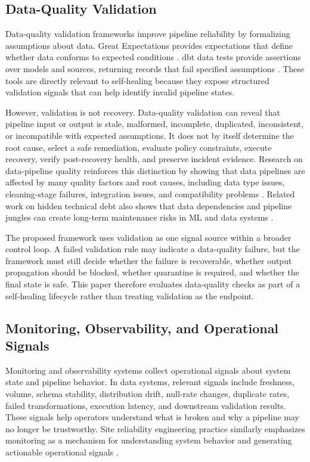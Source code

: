 \subsection{Data-Quality Validation}

Data-quality validation frameworks improve pipeline reliability by formalizing assumptions about data. Great Expectations provides expectations that define whether data conforms to expected conditions \cite{greatexpectations2026}. dbt data tests provide assertions over models and sources, returning records that fail specified assumptions \cite{dbt2026datatests}. These tools are directly relevant to self-healing because they expose structured validation signals that can help identify invalid pipeline states.

However, validation is not recovery. Data-quality validation can reveal that pipeline input or output is stale, malformed, incomplete, duplicated, inconsistent, or incompatible with expected assumptions. It does not by itself determine the root cause, select a safe remediation, evaluate policy constraints, execute recovery, verify post-recovery health, and preserve incident evidence. Research on data-pipeline quality reinforces this distinction by showing that data pipelines are affected by many quality factors and root causes, including data type issues, cleaning-stage failures, integration issues, and compatibility problems \cite{foidl2023pipelinequality}. Related work on hidden technical debt also shows that data dependencies and pipeline jungles can create long-term maintenance risks in ML and data systems \cite{sculley2015hidden}.

The proposed framework uses validation as one signal source within a broader control loop. A failed validation rule may indicate a data-quality failure, but the framework must still decide whether the failure is recoverable, whether output propagation should be blocked, whether quarantine is required, and whether the final state is safe. This paper therefore evaluates data-quality checks as part of a self-healing lifecycle rather than treating validation as the endpoint.

\subsection{Monitoring, Observability, and Operational Signals}

Monitoring and observability systems collect operational signals about system state and pipeline behavior. In data systems, relevant signals include freshness, volume, schema stability, distribution drift, null-rate changes, duplicate rates, failed transformations, execution latency, and downstream validation results. These signals help operators understand what is broken and why a pipeline may no longer be trustworthy. Site reliability engineering practice similarly emphasizes monitoring as a mechanism for understanding system behavior and generating actionable operational signals \cite{googlesre2026monitoring}.

